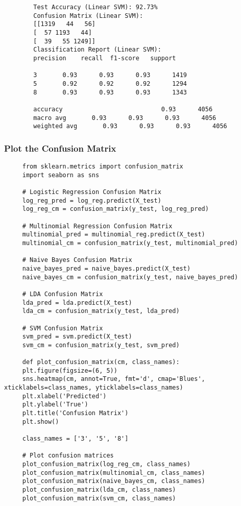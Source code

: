 \documentclass[letterpaper]{article}
\begin{document}
\begin{minipage}{\linewidth}
	\begin{Verbatim}
		Test Accuracy (Linear SVM): 92.73%
		Confusion Matrix (Linear SVM):
		[[1319   44   56]
		[  57 1193   44]
		[  39   55 1249]]
		Classification Report (Linear SVM):
		precision    recall  f1-score   support
		
		3       0.93      0.93      0.93      1419
		5       0.92      0.92      0.92      1294
		8       0.93      0.93      0.93      1343
		
		accuracy                           0.93      4056
		macro avg       0.93      0.93      0.93      4056
		weighted avg       0.93      0.93      0.93      4056
	\end{Verbatim}
\end{minipage}

\subsubsection{Plot the Confusion Matrix}
\begin{lstlisting}
     from sklearn.metrics import confusion_matrix
     import seaborn as sns
     
     # Logistic Regression Confusion Matrix
     log_reg_pred = log_reg.predict(X_test)
     log_reg_cm = confusion_matrix(y_test, log_reg_pred)
     
     # Multinomial Regression Confusion Matrix
     multinomial_pred = multinomial_reg.predict(X_test)
     multinomial_cm = confusion_matrix(y_test, multinomial_pred)
     
     # Naive Bayes Confusion Matrix
     naive_bayes_pred = naive_bayes.predict(X_test)
     naive_bayes_cm = confusion_matrix(y_test, naive_bayes_pred)
     
     # LDA Confusion Matrix
     lda_pred = lda.predict(X_test)
     lda_cm = confusion_matrix(y_test, lda_pred)
     
     # SVM Confusion Matrix
     svm_pred = svm.predict(X_test)
     svm_cm = confusion_matrix(y_test, svm_pred)
     
     def plot_confusion_matrix(cm, class_names):
     plt.figure(figsize=(6, 5))
     sns.heatmap(cm, annot=True, fmt='d', cmap='Blues', xticklabels=class_names, yticklabels=class_names)
     plt.xlabel('Predicted')
     plt.ylabel('True')
     plt.title('Confusion Matrix')
     plt.show()
     
     class_names = ['3', '5', '8']
     
     # Plot confusion matrices
     plot_confusion_matrix(log_reg_cm, class_names)
     plot_confusion_matrix(multinomial_cm, class_names)
     plot_confusion_matrix(naive_bayes_cm, class_names)
     plot_confusion_matrix(lda_cm, class_names)
     plot_confusion_matrix(svm_cm, class_names)
\end{lstlisting}
\end{document}
